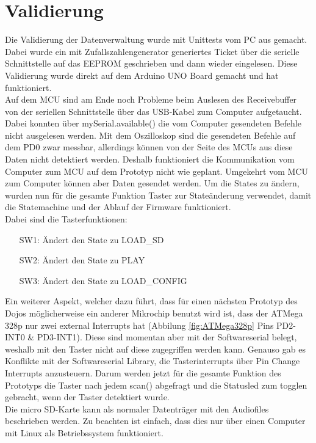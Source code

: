 \section{Validierung}
Die Validierung der Datenverwaltung wurde mit Unittests vom PC aus gemacht. Dabei wurde ein mit Zufallszahlengenerator generiertes Ticket über die serielle Schnittstelle auf das EEPROM geschrieben und dann wieder eingelesen. Diese Validierung wurde direkt auf dem Arduino UNO Board gemacht und hat funktioniert.
\\[0.5cm]
Auf dem MCU sind am Ende noch Probleme beim Auslesen des Receivebuffer von der seriellen Schnittstelle über das USB-Kabel zum Computer aufgetaucht. Dabei konnten über mySerial.available() die vom Computer gesendeten Befehle nicht ausgelesen werden. Mit dem Oszilloskop sind die gesendeten Befehle auf dem PD0 zwar messbar, allerdings können von der Seite des MCUs aus diese \glqq Daten\grqq\; nicht detektiert werden. Deshalb funktioniert die Kommunikation vom Computer zum MCU auf dem Prototyp nicht wie geplant. Umgekehrt vom MCU zum Computer können aber Daten gesendet werden. Um die States zu ändern, wurden nun für die gesamte Funktion Taster zur Stateänderung verwendet, damit die Statemachine und der Ablauf der Firmware funktioniert.
\\[0.5cm]
Dabei sind die Tasterfunktionen:
\begin{itemize}[leftmargin=1.2cm]
\item[SW1:] Ändert den State zu LOAD\_SD
\item[SW2:] Ändert den State zu PLAY
\item[SW3:] Ändert den State zu LOAD\_CONFIG
\end{itemize}
Ein weiterer Aspekt, welcher dazu führt, dass für einen nächsten Prototyp des Dojos möglicherweise ein anderer Mikrochip benutzt wird ist, dass der ATMega 328p nur zwei external Interrupts hat (Abbilung \ref{fig:ATMega328p} Pins PD2-INT0 \& PD3-INT1). Diese sind momentan aber mit der Softwareserial belegt, weshalb mit den Taster nicht auf diese zugegriffen werden kann. Genauso gab es Konflikte mit der Softwareserial Library, die Tasterinterrupts über Pin Change Interrupts anzusteuern. Darum werden jetzt für die gesamte Funktion des Prototyps die Taster nach jedem scan() abgefragt und die Statusled zum togglen gebracht, wenn der Taster detektiert wurde.
\\[0.5cm]
Die micro SD-Karte kann als normaler Datenträger mit den Audiofiles beschrieben werden. Zu beachten ist einfach, dass dies nur über einen Computer mit Linux als Betriebssystem funktioniert.